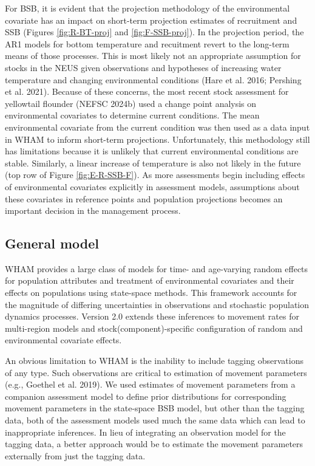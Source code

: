 \documentclass[
]{article}
\begin{document}
For BSB, it is evident that the projection methodology of the environmental covariate has an impact on short-term projection estimates of recruitment and SSB (Figures \ref{fig:R-BT-proj} and \ref{fig:F-SSB-proj}). In the projection period, the AR1 models for bottom temperature and recuitment revert to the long-term means of those processes. This is most likely not an appropriate assumption for stocks in the NEUS given observations and hypotheses of increasing water temperature and changing environmental conditions (Hare et al. 2016; Pershing et al. 2021). Because of these concerns, the most recent stock assessment for yellowtail flounder (NEFSC 2024b) used a change point analysis on environmental covariates to determine current conditions. The mean environmental covariate from the current condition was then used as a data input in WHAM to inform short-term projections. Unfortunately, this methodology still has limitations because it is unlikely that current environmental conditions are stable. Similarly, a linear increase of temperature is also not likely in the future (top row of Figure \ref{fig:E-R-SSB-F}). As more assessments begin including effects of environmental covariates explicitly in assessment models, assumptions about these covariates in reference points and population projections becomes an important decision in the management process.

\hypertarget{general-model}{%
\subsection*{General model}\label{general-model}}

WHAM provides a large class of models for time- and age-varying random effects for population attributes and treatment of environmental covariates and their effects on populations using state-space methods. This framework accounts for the magnitude of differing uncertainties in observations and stochastic population dynamics processes. Version 2.0 extends these inferences to movement rates for multi-region models and stock(component)-specific configuration of random and environmental covariate effects.

An obvious limitation to WHAM is the inability to include tagging observations of any type. Such observations are critical to estimation of movement parameters (e.g., Goethel et al. 2019). We used estimates of movement parameters from a companion assessment model to define prior distributions for corresponding movement parameters in the state-space BSB model, but other than the tagging data, both of the assessment models used much the same data which can lead to inappropriate inferences. In lieu of integrating an observation model for the tagging data, a better approach would be to estimate the movement parameters externally from just the tagging data.
\end{document}
